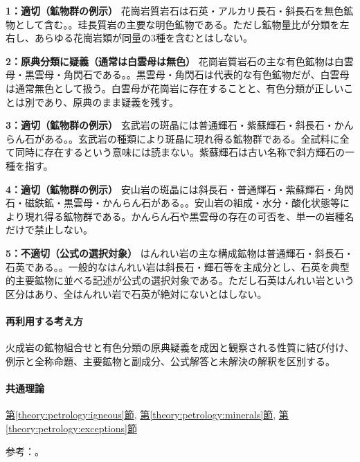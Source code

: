\noindent\textbf{1：適切（鉱物群の例示）} 花崗岩質岩石は石英・アルカリ長石・斜長石を無色鉱物として含む。。珪長質岩の主要な明色鉱物である。ただし鉱物量比が分類を左右し、あらゆる花崗岩類が同量の3種を含むとはしない。\par

\noindent\textbf{2：原典分類に疑義（通常は白雲母は無色）} 花崗岩質岩石の主な有色鉱物は白雲母・黒雲母・角閃石である。。黒雲母・角閃石は代表的な有色鉱物だが、白雲母は通常無色として扱う。白雲母が花崗岩に存在することと、有色分類が正しいことは別であり、原典のまま疑義を残す。\par

\noindent\textbf{3：適切（鉱物群の例示）} 玄武岩の斑晶には普通輝石・紫蘇輝石・斜長石・かんらん石がある。。玄武岩の種類により斑晶に現れ得る鉱物群である。全試料に全て同時に存在するという意味には読まない。紫蘇輝石は古い名称で斜方輝石の一種を指す。\par

\noindent\textbf{4：適切（鉱物群の例示）} 安山岩の斑晶には斜長石・普通輝石・紫蘇輝石・角閃石・磁鉄鉱・黒雲母・かんらん石がある。。安山岩の組成・水分・酸化状態等により現れ得る鉱物群である。かんらん石や黒雲母の存在の可否を、単一の岩種名だけで禁止しない。\par

\noindent\textbf{5：不適切（公式の選択対象）} はんれい岩の主な構成鉱物は普通輝石・斜長石・石英である。。一般的なはんれい岩は斜長石・輝石等を主成分とし、石英を典型的主要鉱物に並べる記述が公式の選択対象である。ただし石英はんれい岩という区分はあり、全はんれい岩で石英が絶対にないとはしない。\par

\paragraph{再利用する考え方} 火成岩の鉱物組合せと有色分類の原典疑義を成因と観察される性質に結び付け、例示と全称命題、主要鉱物と副成分、公式解答と未解決の解釈を区別する。

\paragraph{共通理論} \hyperref[theory:petrology:igneous]{第\ref*{theory:petrology:igneous}節}, \hyperref[theory:petrology:minerals]{第\ref*{theory:petrology:minerals}節}, \hyperref[theory:petrology:exceptions]{第\ref*{theory:petrology:exceptions}節}

\par 参考：\cite{aist_crystal_colors,gsj_igneous2021,usgs_rock_thesaurus}。

